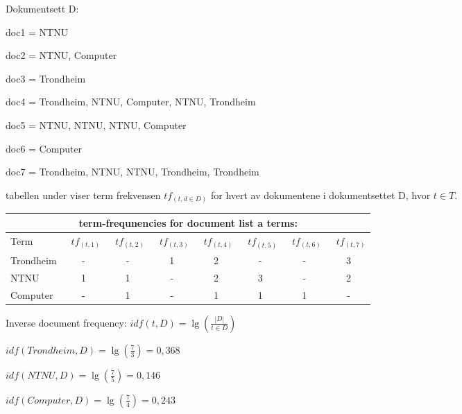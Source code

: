 \documentclass[]{article}
\begin{document}
Dokumentsett D:
\vspace{1 mm}

doc1 = NTNU

doc2 = NTNU, Computer

doc3 = Trondheim

doc4 = Trondheim, NTNU, Computer, NTNU, Trondheim

doc5 = NTNU, NTNU, NTNU, Computer

doc6 = Computer

doc7 = Trondheim, NTNU, NTNU, Trondheim, Trondheim 
\vspace{5 mm}

tabellen under viser term frekvensen $tf_{(t,d \in D)}$ for hvert av dokumentene i dokumentsettet D, hvor $t \in T$.
\vspace{10 mm}

\begin{center}
\begin{tabular}[t]{|l|ccccccc|}

\multicolumn{8}{c}{term-frequnencies for document list a terms:}\\\hline

Term&\ $tf_{(t,1)}$&\ $tf_{(t,2)}$&\ $tf_{(t,3)}$&\ $tf_{(t,4)}$&\ $tf_{(t,5)}$&\ $tf_{(t,6)}$&\ $tf_{(t,7)}$\\\hline

Trondheim&-&-&1&2&-&-&3\\

NTNU&1&1&-&2&3&-&2\\

Computer&-&1&-&1&1&1&-\\\hline
\end{tabular}
\end{center}
\vspace{10 mm}

\begin{center}

Inverse document frequency:
\vspace{5 mm}
$idf(t, D) = \lg(\frac{|D|}{t \in D})$

\vspace{5 mm}

$idf(Trondheim, D) = \lg(\frac{7}{3}) = 0,368$
\vspace{5 mm}

$idf(NTNU, D) = \lg(\frac{7}{5}) = 0,146$
\vspace{5 mm}

$idf(Computer, D) = \lg(\frac{7}{4}) = 0,243$

\end{center}
\end{document}
